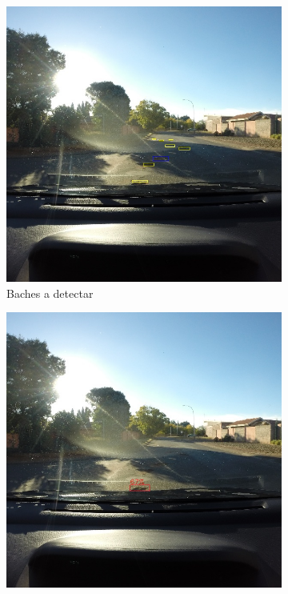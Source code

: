\begin{figure}[H]
	\centering
	\begin{subfigure}[h]{0.45\linewidth}
		\includegraphics[width=\linewidth]{images/results_c_gt.jpg}
		\caption{Baches a detectar}
	\end{subfigure}
	\begin{subfigure}[h]{0.45\linewidth}
		\includegraphics[width=\linewidth]{images/results_c_yolo_v3_256.jpg}

\end{subfigure}
\end{figure}
